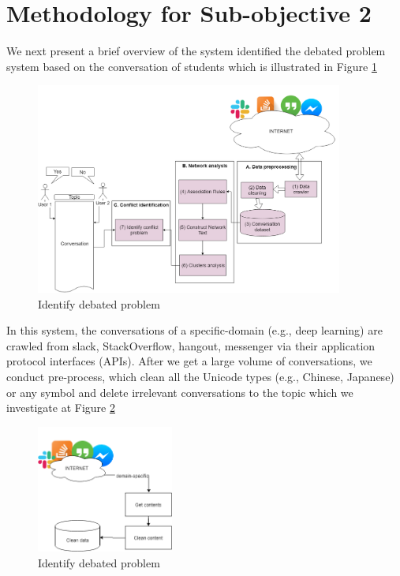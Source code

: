 \documentclass[letterpaper%
, twoside%
, 12pt%
,these%
, english%
,creativecommons,hyperref, withAlgo2e %
]{thETS}
\begin{document}
\section{Methodology for Sub-objective 2}
We next present a brief overview of the system identified the debated problem system based on the conversation of students which is illustrated in Figure \ref{dpr}
\begin{figure}
	\includegraphics[width=0.9\textwidth]{Figures/32.png}
	\caption{Identify debated problem }
	\label{dpr}
\end{figure}

In this system, the conversations of a specific-domain (e.g., deep learning) are crawled from slack, StackOverflow, hangout, messenger via their application protocol interfaces (APIs). After we get a large volume of conversations, we conduct pre-process, which clean all the Unicode types (e.g., Chinese, Japanese) or any symbol and delete irrelevant conversations to the topic which we investigate at Figure \ref{dataobj2}


\begin{figure}
\includegraphics[width=0.4\textwidth]{Figures/dts.png}
\caption{Identify debated problem}
\label{dataobj2}
\end{figure}
\end{document}
